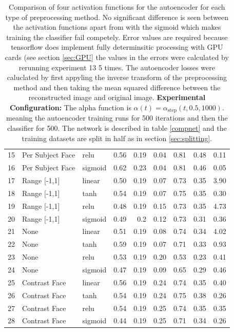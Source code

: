\begin{table}[!h]
{\begin{tabular}{lllrrrrrr}
         15&Per Subject Face  & relu   &    0.56 &   0.19 &     0.04 &    0.81 &   0.48 &     0.11 \\
         16& Per Subject Face      & sigmoid &    0.62 &   0.23 &     0.04 &    0.81 &   0.46 &     0.05 \\
         17&Range [-1,1]      & linear &    0.50 &   0.19 &     0.07 &    0.73 &   0.35 &     3.90 \\
         18&Range [-1,1]      & tanh   &    0.54 &   0.19 &     0.07 &    0.75 &   0.35 &     0.30 \\
         19&Range [-1,1]      & relu   &    0.48 &   0.19 &     0.15 &    0.73 &   0.35 &     4.73 \\
         20& Range [-1,1]      & sigmoid &    0.49 &   0.2  &     0.12 &    0.73 &   0.31 &     0.36 \\
         21&None              & linear &    0.51 &   0.19 &     0.08 &    0.74 &   0.34 &     4.02 \\
         22&None              & tanh   &    0.59 &   0.19 &     0.07 &    0.71 &   0.33 &     0.93 \\
         23&None              & relu   &    0.53 &   0.19 &     0.20 &    0.53 &   0.23 &     0.41 \\
         24& None       & sigmoid &    0.47 &   0.19 &     0.09 &    0.65 &   0.29 &     0.46 \\
         25&Contrast Face     & linear &    0.56 &   0.19 &     0.24 &    0.74 &   0.35 &     0.40 \\
         26&Contrast Face     & tanh   &    0.54 &   0.19 &     0.24 &    0.75 &   0.38 &     0.26 \\
         27&Contrast Face     & relu   &    0.54 &   0.19 &     0.25 &    0.74 &   0.35 &     0.35 \\
         28& Contrast Face    & sigmoid &    0.44 &   0.19 &     0.25 &    0.71 &   0.34 &     0.26 \\
         \hline
        \end{tabular}
          \caption{Comparison of four activation functions for the autoencoder for each type of preprocessing method.
          No significant difference is seen between the activation functions apart from with the sigmoid
          which makes training the classifier fail competely.
          Error values are required because tensorflow does implement fully determinsitic
          processing with GPU cards (see section \ref{sec:GPU} the values in the errors were
          calculated by rerunning experiment 13 5 times. The autoencoder losses were caluclated
          by first appyling the inverse transform of the preprocessing method and then taking the mean squared
          difference between the reconstructed image and original image. {\bf Experimental Configuration:}
          The alpha function is $\alpha(t)=\alpha_{\text{step}}(t,0.5,1000)$.
          meaning the autoencoder training runs for 500 iterations and then the classifier for 500.
          The network is described in table \ref{compnet} and the training datasets are split in half as in section
          \ref{sec:splitting}.}
      \label{tab:psearch} }
      \end{table}

